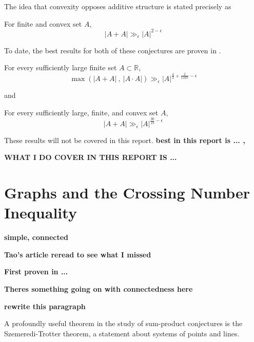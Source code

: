 \documentclass[12pt]{amsart}
\begin{document}
The idea that convexity opposes additive structure is stated precisely as

\begin{conjecture}
    For finite and convex set \(A\),
    \[
        \left\lvert A+A \right\rvert \gg_{\epsilon}  \left\lvert A \right\rvert ^{2-\epsilon}
    \]
\end{conjecture}

To date, the best results for both of these conjectures are proven in \cite{stevens-rudnev}.
\begin{theorem}
    For every sufficiently large finite set \(A \subset \mathbb{R} \),
    \[
        \max \left( \left\lvert A+A \right\rvert ~,~ \left\lvert A \cdot A \right\rvert  \right) \gg_{\epsilon}   \left\lvert A \right\rvert^{\frac{4}{3} + \frac{2}{1167} - \epsilon}
    \]
\end{theorem}
and
\begin{theorem}
    For every sufficiently large, finite, and convex set \(A\),
    \[
        \left\lvert A+A \right\rvert \gg_{\epsilon}  \left\lvert A \right\rvert ^{\frac{30}{19} - \epsilon }
    \]
\end{theorem}

These results will not be covered in this report.
\textbf{best in this report is ... ,}

\textbf{WHAT I DO COVER IN THIS REPORT IS ...}

\section{Graphs and the Crossing Number Inequality}

\textbf{simple, connected}

\textbf{Tao's article reread to see what I missed}

\textbf{First proven in ...}

\textbf{Theres something going on with connectedness here}


\textbf{rewrite this paragraph}

A profoundly useful theorem in the study of sum-product conjectures is the
Szemeredi-Trotter theorem, a statement about systems of points and lines.
\end{document}
